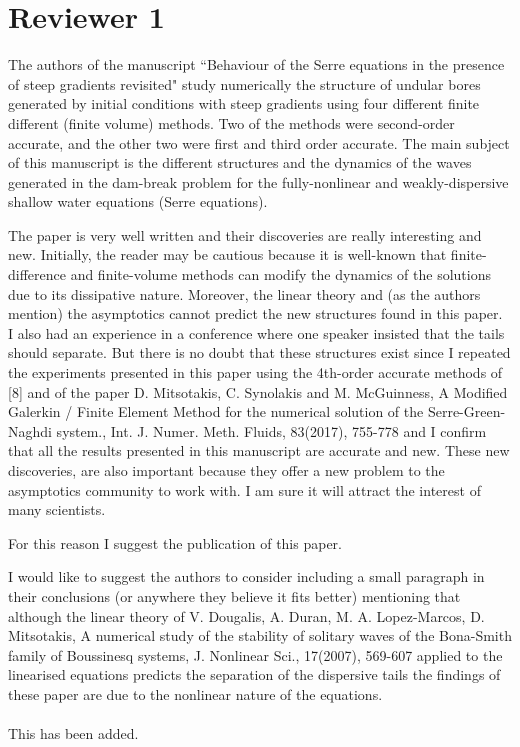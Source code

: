 \documentclass[times]{article}
\begin{document}
	
\section{Reviewer 1}

The authors of the manuscript ``Behaviour of the Serre equations in the presence of steep gradients revisited" study numerically the structure of undular bores generated by initial conditions with steep gradients using four different finite different (finite volume) methods. Two of the methods were second-order accurate, and the other two were first and third order accurate. The main subject of this manuscript is the different structures and the dynamics of the waves generated in the dam-break problem for the fully-nonlinear and weakly-dispersive shallow water equations (Serre equations).

The paper is very well written and their discoveries are really interesting and new. Initially, the reader may be cautious because it is well-known that finite-difference and finite-volume methods can modify the dynamics of the solutions due to its dissipative nature. Moreover, the linear theory and (as the authors mention) the asymptotics cannot predict the new structures found in this paper. I also had an experience in a conference where one speaker insisted that the tails should separate. But there is no doubt that these structures exist since I repeated the experiments presented in this paper using the  4th-order accurate methods of [8] and of the paper
D. Mitsotakis, C. Synolakis and M. McGuinness, A Modified Galerkin / Finite Element Method for the numerical solution of the Serre-Green-Naghdi system., Int. J. Numer. Meth. Fluids, 83(2017), 755-778 and I confirm that all the results presented in this manuscript are accurate and new. These new discoveries,  are also important because they offer a new problem to the asymptotics community to work with.  I am sure it will attract the interest of many scientists.


For this reason I suggest the publication of this paper.

I would like to suggest the authors to consider including a small paragraph in their conclusions (or anywhere they believe it fits better) mentioning that although the linear theory of V.  Dougalis, A. Duran, M. A. Lopez-Marcos, D. Mitsotakis,  A numerical study of the stability of solitary waves of the Bona-Smith family of Boussinesq systems, J. Nonlinear Sci., 17(2007), 569-607 applied to the linearised equations predicts the separation of the dispersive tails the findings of these paper are due to the nonlinear nature of the equations.
	\\ \\
	{\color{blue} This has been added.} \\ \\
\end{document}
